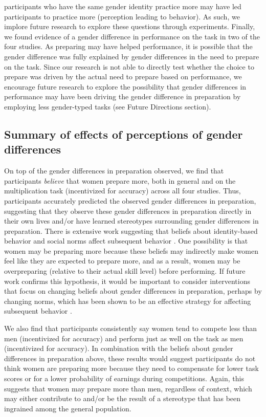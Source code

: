 \documentclass[letterpaper, nobind]{templates/ociamthesis}
\begin{document}
participants who have the same gender identity practice more may have led participants to practice more (perception leading to behavior). As such, we implore future research to explore these questions through experiments. Finally, we found evidence of a gender difference in performance on the task in two of the four studies. As preparing may have helped performance, it is possible that the gender difference was fully explained by gender differences in the need to prepare on the task. Since our research is not able to directly test whether the choice to prepare was driven by the actual need to prepare based on performance, we encourage future research to explore the possibility that gender differences in performance may have been driving the gender difference in preparation by employing less gender-typed tasks (see Future Directions section).

\hypertarget{summary-of-effects-of-perceptions-of-gender-differences}{%
\subsection{Summary of effects of perceptions of gender differences}\label{summary-of-effects-of-perceptions-of-gender-differences}}

On top of the gender differences in preparation observed, we find that participants \emph{believe} that women prepare more, both in general and on the multiplication task (incentivized for accuracy) across all four studies. Thus, participants accurately predicted the observed gender differences in preparation, suggesting that they observe these gender differences in preparation directly in their own lives and/or have learned stereotypes surrounding gender differences in preparation. There is extensive work suggesting that beliefs about identity-based behavior and social norms affect subsequent behavior \autocite{Babcock2012,Bowles2007,Toosi2019,Smith2014,Benjamin2010c,Bertrand2015,Akerlof2000}. One possibility is that women may be preparing more because these beliefs may indirectly make women feel like they are expected to prepare more, and as a result, women may be overpreparing (relative to their actual skill level) before performing. If future work confirms this hypothesis, it would be important to consider interventions that focus on changing beliefs about gender differences in preparation, perhaps by changing norms, which has been shown to be an effective strategy for affecting subsequent behavior \autocite{Miller2016}.

We also find that participants consistently say women tend to compete less than men (incentivized for accuracy) and perform just as well on the task as men (incentivized for accuracy). In combination with the beliefs about gender differences in preparation above, these results would suggest participants do not think women are preparing more because they need to compensate for lower task scores or for a lower probability of earnings during competitions. Again, this suggests that women may prepare more than men, regardless of context, which may either contribute to and/or be the result of a stereotype that has been ingrained among the general population.
\end{document}
